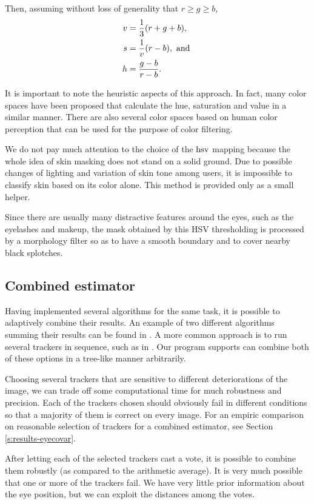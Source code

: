 Then, assuming without loss of generality that $r \geq g \geq b$,
\begin{align}
v &= \frac 1 3 (r + g + b), \notag \\
s &= \frac 1 v (r - b ), \textrm{ and } \\
h &= \frac {g - b} {r - b}. \notag
\end{align}


It is important to note the heuristic aspects of this approach.
In fact, many color spaces have been proposed that calculate the hue, saturation and value in a similar manner.
There are also several color spaces based on human color perception that can be used for the purpose of color filtering.

We do not pay much attention to the choice of the $\mathrm{hsv}$ mapping because the whole idea of skin masking does not stand on a solid ground.
Due to possible changes of lighting and variation of skin tone among users, it is impossible to classify skin based on its color alone.
This method is provided only as a small helper.

Since there are usually many distractive features around the eyes, such as the eyelashes and makeup, the mask obtained by this HSV thresholding is processed by a morphology filter so as to have a smooth boundary and to cover nearby black splotches.

\subsection{Combined estimator}

Having implemented several algorithms for the same task, it is possible to adaptively combine their results.
An example of two different algorithms summing their results can be found in \cite{leo14}.
A more common approach is to run several trackers in sequence, such as in \cite{wang16,george16,zhu12}.
Our program supports can combine both of these options in a tree-like manner arbitrarily.

Choosing several trackers that are sensitive to different deteriorations of the image, we can trade off some computational time for much robustness and precision.
Each of the trackers chosen should obviously fail in different conditions so that a majority of them is correct on every image.
For an empiric comparison on reasonable selection of trackers for a combined estimator, see Section \ref{s:results-eyecovar}.

After letting each of the selected trackers cast a vote, it is possible to combine them robustly (as compared to the arithmetic average).
It is very much possible that one or more of the trackers fail.
We have very little prior information about the eye position, but we can exploit the distances among the votes.


